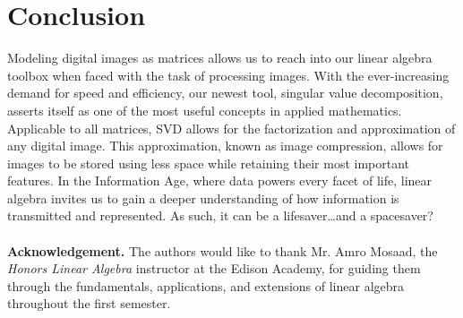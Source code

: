 \documentclass[12pt, reqno]{amsart}
\theoremstyle{definition}
\theoremstyle{remark}
\numberwithin{equation}{section}
\begin{document}
\section{Conclusion}
\noindent Modeling digital images as matrices allows us to reach into our linear algebra toolbox when faced with the task of processing images. With the ever-increasing demand for speed and efficiency, our newest tool, singular value decomposition, asserts itself as one of the most useful concepts in applied mathematics. Applicable to all matrices, SVD allows for the factorization and approximation of any digital image. This approximation, known as image compression, allows for images to be stored using less space while retaining their most important features. In the Information Age, where data powers every facet of life, linear algebra invites us to gain a deeper understanding of how information is transmitted and represented. As such, it can be a lifesaver…and a spacesaver?
\\
\\
\noindent \textbf{Acknowledgement.} The authors would like to thank Mr. Amro Mosaad, the \textit{Honors Linear Algebra} instructor at the Edison Academy, for guiding them through the fundamentals, applications, and extensions of linear algebra throughout the first semester.
\end{document}

